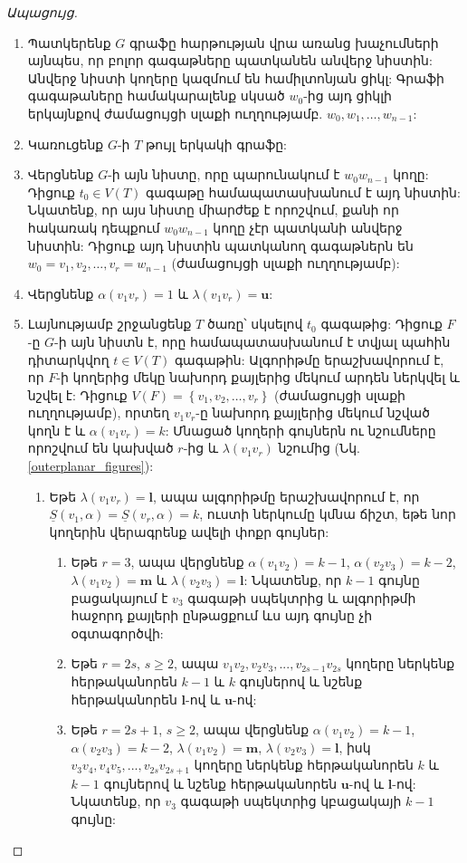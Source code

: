 \begin{hide}
\begin{proof}[Ապացույց]
\begin{enumerate}
\item Պատկերենք $G$ գրաֆը հարթության վրա առանց խաչումների այնպես, որ բոլոր գագաթները պատկանեն անվերջ նիստին: Անվերջ նիստի կողերը կազմում են համիլտոնյան ցիկլ: Գրաֆի գագաթաները համակարալենք սկսած $w_0$-ից այդ ցիկլի երկայնքով ժամացույցի սլաքի ուղղությամբ. $w_0, w_1, \ldots, w_{n-1}$:
\item Կառուցենք $G$-ի $T$ թույլ երկակի գրաֆը:
\item Վերցնենք $G$-ի այն նիստը, որը պարունակում է $w_0w_{n-1}$ կողը: Դիցուք $t_0 \in V(T)$ գագաթը համապատասխանում է այդ նիստին: Նկատենք, որ այս նիստը միարժեք է որոշվում, քանի որ հակառակ դեպքում $w_0w_{n-1}$ կողը չէր պատկանի անվերջ նիստին: Դիցուք այդ նիստին պատկանող գագաթներն են $w_0=v_1,v_2,\ldots,v_r=w_{n-1}$ (ժամացույցի սլաքի ուղղությամբ):
\item Վերցնենք $\alpha(v_1v_r) = 1$ և $\lambda(v_1v_r)=\bm{u}$: \label{algo_set_first}
\item Լայնությամբ շրջանցենք $T$ ծառը՝ սկսելով $t_0$ գագաթից: Դիցուք $F$-ը $G$-ի այն նիստն է, որը համապատասխանում է տվյալ պահին դիտարկվող $t \in V(T)$ գագաթին: Ալգորիթմը երաշխավորում է, որ $F$-ի կողերից մեկը նախորդ քայլերից մեկում արդեն ներկվել և նշվել է: Դիցուք $V(F) = \left\{v_1,v_2,\ldots,v_r\right\}$ (ժամացույցի սլաքի ուղղությամբ), որտեղ $v_1v_r$-ը նախորդ քայլերից մեկում նշված կողն է և $\alpha(v_1v_r)=k$: Մնացած կողերի գույներն ու նշումները որոշվում են կախված $r$-ից և $\lambda(v_1v_r)$ նշումից (Նկ. \ref{outerplanar_figures}): \label{algo_traverse}
	\begin{enumerate}
    \item Եթե $\lambda(v_1v_r)=\bm{l}$, ապա ալգորիթմը երաշխավորում է, որ $\underline{S}(v_1, \alpha) = \underline{S}(v_r, \alpha) = k$, ուստի ներկումը կմնա ճիշտ, եթե նոր կողերին վերագրենք ավելի փոքր գույներ:
    	\begin{enumerate}
    	\item Եթե $r=3$, ապա վերցնենք $\alpha(v_1v_2)=k-1$, $\alpha(v_2v_3)=k-2$, $\lambda(v_1v_2)=\bm{m}$ և $\lambda(v_2v_3)=\bm{l}$: Նկատենք, որ $k-1$ գույնը բացակայում է $v_3$ գագաթի սպեկտրից և ալգորիթմի հաջորդ քայլերի ընթացքում ևս այդ գույնը չի օգտագործվի: \label{step3l}
        \item Եթե $r=2s$, $s\geq 2$, ապա $v_1v_2, v_2v_3, ..., v_{2s-1}v_{2s}$ կողերը ներկենք հերթականորեն $k-1$ և $k$ գույներով և նշենք հերթականորեն $\bm{l}$-ով և $\bm{u}$-ով: \label{step4l}
        \item Եթե $r=2s+1$, $s\geq 2$, ապա վերցնենք $\alpha(v_1v_2)=k-1$, $\alpha(v_2v_3)=k-2$, $\lambda(v_1v_2)=\bm{m}$, $\lambda(v_2v_3)=\bm{l}$, իսկ $v_3v_4, v_4v_5, ..., v_{2s}v_{2s+1}$ կողերը ներկենք հերթականորեն $k$ և $k-1$ գույներով և նշենք հերթականորեն $\bm{u}$-ով և $\bm{l}$-ով: Նկատենք, որ $v_3$ գագաթի սպեկտրից կբացակայի $k-1$ գույնը:\label{step5l}
    	\end{enumerate}
    

\end{enumerate}
\end{enumerate}
\end{proof}
\end{hide}
